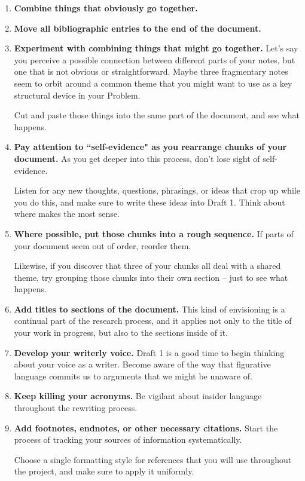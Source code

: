 \documentclass[11pt]{article}
\begin{document}
\begin{itemize}
\begin{exercise}
\begin{enumerate}
\item \textbf{Combine things that obviously go together.}

\item \textbf{Move all bibliographic entries to the end of the document.}

\item \textbf{Experiment with combining things that might go together.} Let’s say you perceive a possible connection between different parts of your notes,
but one that is not obvious or straightforward. Maybe three fragmentary notes seem to orbit around a common theme that you might want to use as a key structural device in your Problem.

Cut and paste those things into the same part of the document, and see what happens.

\item \textbf{Pay attention to ``self-evidence" as you rearrange chunks of your document. } As you get deeper into this process, don’t lose sight of self-evidence. 

Listen for any new thoughts, questions, phrasings, or ideas that crop up while you do this, and make sure to write these ideas into Draft 1. Think about where makes the most sense. 

\item \textbf{Where possible, put those chunks into a rough sequence.}  If parts of your document seem out of order, reorder them. 

Likewise, if you discover that three of your chunks all deal with a shared theme, try grouping those chunks into their own section -- just to see what happens.

\item \textbf{Add titles to sections of the document. } This kind of envisioning is a continual part of the research process, and it applies not only to the title of your work in progress, but also to the sections inside of it.

\item \textbf{Develop your writerly voice.} Draft 1 is a good time to begin thinking about your voice as a writer. Become aware of the way that figurative language commits us to arguments that we might be unaware of. 

\item \textbf{Keep killing your acronyms.} Be vigilant about insider language throughout the rewriting process.

\item \textbf{Add footnotes, endnotes, or other necessary citations.} Start the process of tracking your sources of information systematically. 

Choose a single formatting style for references that you will use throughout the project, and make sure to apply it uniformly. 
\end{enumerate}
\end{exercise}
\end{itemize}
\end{document}
